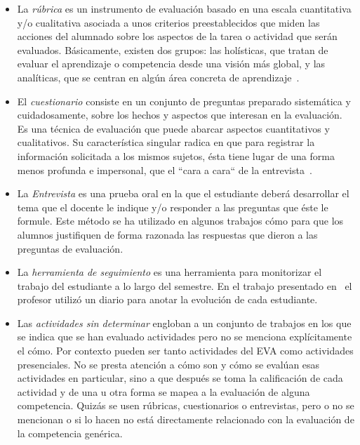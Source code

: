 \begin{itemize}
\item La \emph{rúbrica} es un instrumento de evaluación basado en una escala cuantitativa y/o cualitativa asociada a unos criterios preestablecidos que miden las acciones del alumnado sobre los aspectos de la tarea o actividad que serán evaluados.  Básicamente, existen dos grupos: las holísticas, que tratan
de evaluar el aprendizaje o competencia desde una visión más global, y las analíticas, que se centran en algún área concreta de aprendizaje~\cite{torres2010rubrica}.
\item El \emph{cuestionario} consiste en un conjunto de preguntas preparado sistemática y cuidadosamente, sobre los hechos y aspectos que interesan en la evaluación.  Es una técnica de evaluación que puede abarcar aspectos cuantitativos y cualitativos. Su característica singular radica en que para registrar la información solicitada a los mismos sujetos, ésta tiene lugar de una forma menos profunda e impersonal, que el ``cara a cara`` de la entrevista~\cite{munoz2003cuestionario}. 
\item La \emph{Entrevista} es una prueba oral en la que el estudiante deberá desarrollar el tema que el docente le indique y/o responder a las preguntas que éste le formule. Este método se ha utilizado en algunos trabajos cómo \cite{ward2011developing} para que los alumnos justifiquen de forma razonada las respuestas que dieron a las preguntas de evaluación.
\item La \emph{herramienta de seguimiento} es una herramienta para monitorizar el trabajo del estudiante a lo largo del semestre. En el trabajo presentado en~\cite{lacuesta2009active} el profesor utilizó un diario para anotar la evolución de cada estudiante.
\item Las \emph{actividades sin determinar} engloban a un conjunto de trabajos en los que se indica que se han evaluado actividades pero no se menciona explícitamente el cómo. Por contexto pueden ser tanto actividades del EVA como actividades presenciales. No se presta atención a cómo son y cómo se evalúan esas actividades en particular, sino a que después se toma la calificación de cada actividad y de una u otra forma se mapea a la evaluación de alguna competencia. Quizás se usen rúbricas, cuestionarios o entrevistas, pero o no se mencionan o si lo hacen no está directamente relacionado con la evaluación de la competencia genérica.

\end{itemize}
